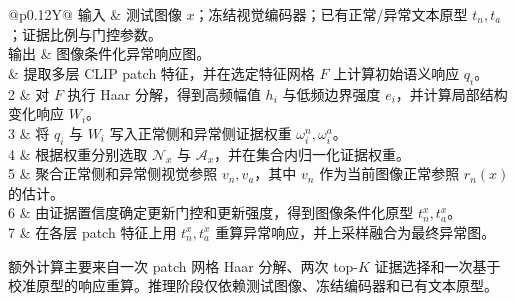\begin{algorithm}[t]
\caption{\method{} 的单图推理流程}
\label{alg:icnr-inference}
\small
\begin{tabularx}{\linewidth}{@{}p{0.12\linewidth}Y@{}}
\toprule
输入 & 测试图像 $x$；冻结视觉编码器；已有正常/异常文本原型 $t_n,t_a$；证据比例与门控参数。 \\
输出 & 图像条件化异常响应图。 \\
 & 提取多层 CLIP patch 特征，并在选定特征网格 $F$ 上计算初始语义响应 $q_i$。 \\
2 & 对 $F$ 执行 Haar 分解，得到高频幅值 $h_i$ 与低频边界强度 $e_i$，并计算局部结构变化响应 $W_i$。 \\
3 & 将 $q_i$ 与 $W_i$ 写入正常侧和异常侧证据权重 $\omega_i^n,\omega_i^a$。 \\
4 & 根据权重分别选取 $\mathcal{N}_x$ 与 $\mathcal{A}_x$，并在集合内归一化证据权重。 \\
5 & 聚合正常侧和异常侧视觉参照 $v_n,v_a$，其中 $v_n$ 作为当前图像正常参照 $r_n(x)$ 的估计。 \\
6 & 由证据置信度确定更新门控和更新强度，得到图像条件化原型 $t_n^x,t_a^x$。 \\
7 & 在各层 patch 特征上用 $t_n^x,t_a^x$ 重算异常响应，并上采样融合为最终异常图。 \\
\bottomrule
\end{tabularx}
\end{algorithm}

额外计算主要来自一次 patch 网格 Haar 分解、两次 top-$K$ 证据选择和一次基于校准原型的响应重算。推理阶段仅依赖测试图像、冻结编码器和已有文本原型。
